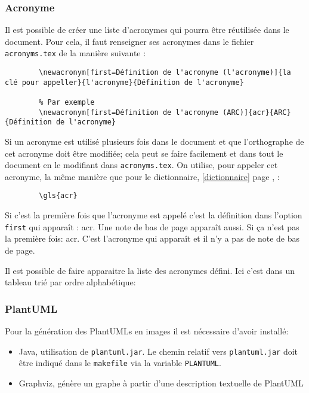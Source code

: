 \subsubsection{Acronyme} \label{acronyme}
Il est possible de créer une liste d'acronymes qui pourra être réutilisée dans le document.
Pour cela, il faut renseigner ses acronymes dans le fichier \verb=acronyms.tex= de la manière suivante :
\begin{code}
    \begin{verbatim}
        \newacronym[first=Définition de l'acronyme (l'acronyme)]{la clé pour appeller}{l'acronyme}{Définition de l'acronyme}

        % Par exemple
        \newacronym[first=Définition de l'acronyme (ARC)]{acr}{ARC}{Définition de l'acronyme}
\end{verbatim}
    \caption{Définition d'un acronyme}
\end{code}

Si un acronyme est utilisé plusieurs fois dans le document et que l'orthographe de cet acronyme doit être modifiée;
cela peut se faire facilement et dans tout le document en le modifiant dans \verb=acronyms.tex=.
On utilise, pour appeler cet acronyme, la même manière que pour le dictionnaire, \ref{dictionnaire} page \pageref{dictionnaire}, :
\begin{code}
    \begin{verbatim}
        \gls{acr}
\end{verbatim}
    \caption{Utilisation d'un acronyme}
\end{code}

Si c'est la première fois que l'acronyme est appelé c'est la définition dans l'option \verb=first= qui apparaît : \gls{acr}.
Une note de bas de page apparaît aussi. \newline
Si ça n'est pas la première fois: \gls{acr}. C'est l'acronyme qui apparaît et il n'y a pas de note de bas de page. \newline

Il est possible de faire apparaitre la liste des acronymes défini. Ici c'est dans un tableau trié par ordre alphabétique:

\newpage
{} %
\printglossary[type=\acronymtype,style=superheaderborder ,title={Définitions, acronymes et abréviations}]
\glsaddallunused %

\subsubsection{PlantUML}
Pour la génération des PlantUMLs en images il est nécessaire d'avoir installé:
\begin{itemize}
    \item Java, utilisation de \verb=plantuml.jar=. Le chemin relatif vers
          \verb=plantuml.jar= doit être indiqué dans le \verb=makefile= via la variable \verb=PLANTUML=.
    \item Graphviz, génère un graphe à partir d'une description textuelle de PlantUML
\end{itemize}

